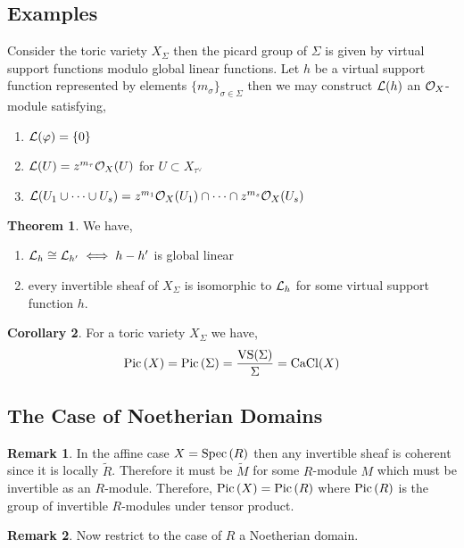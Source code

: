 \documentclass[12pt]{extarticle}
\theoremstyle{definition}
\newtheorem{theorem}{Theorem}[section]
\newtheorem{corollary}[theorem]{Corollary}
\newtheorem{remark}{Remark}
\begin{document}
\subsection{Examples}

Consider the toric variety $X_\Sigma$ then the picard group of $\Sigma$ is given by virtual support functions modulo global linear functions. Let $h$ be a virtual support function represented by elements $\{ m_\sigma \}_{\sigma \in \Sigma}$ then we may construct $\mathcal{L}(h)$ an $\mathcal{O}_{X}$-module satisfying,
\begin{enumerate}
\item $\mathcal{L}(\varphi) = \{ 0 \}$
\item $\mathcal{L}(U) = z^{m_\tau} \mathcal{O}_{X}(U)$ for $U \subset X_{\tau^\vee}$
\item $\mathcal{L}(U_1 \cup \cdots \cup U_s) = z^{m_1} \mathcal{O}_{X}(U_1) \cap \cdots \cap z^{m_s} \mathcal{O}_{X}(U_s)$
\end{enumerate}

\begin{theorem}
We have,
\begin{enumerate}
\item $\mathcal{L}_h \cong \mathcal{L}_{h'} \iff h - h'$ is global linear
\item every invertible sheaf of $X_\Sigma$ is isomorphic to $\mathcal{L}_h$ for some virtual support function $h$. 
\end{enumerate}
\end{theorem}

\begin{corollary}
For a toric variety $X_\Sigma$ we have,
\[ \mathrm{Pic}\left( X \right) = \mathrm{Pic}\left( \Sigma \right) = \frac{\mathrm{VS}(\Sigma)}{\Sigma} = \mathrm{CaCl}(X) \]
\end{corollary}

\subsection{The Case of Noetherian Domains}

\begin{remark}
In the affine case $X = \mathrm{Spec}\left( R \right)$ then any invertible sheaf is coherent since it is locally $\widetilde{R}$. Therefore it must be $\widetilde{M}$ for some $R$-module $M$ which must be invertible as an $R$-module. Therefore, $\mathrm{Pic}\left( X \right) = \mathrm{Pic}\left( R \right)$ where $\mathrm{Pic}\left( R \right)$ is the group of invertible $R$-modules under tensor product. 
\end{remark}

\begin{remark}
Now restrict to the case of $R$ a Noetherian domain.
\end{remark}
\end{document}
